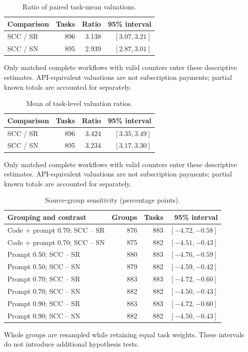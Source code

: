 \begin{table}[htbp]\centering\small
\caption{Ratio of paired task-mean valuations.}
\label{tab:scc2000-resource-pooled}
\begin{tabular}{lrrr}\toprule
Comparison & Tasks & Ratio & 95\% interval\\\midrule
SCC / SR & 896 & 3.138 & $[3.07, 3.21]$\\
SCC / SN & 895 & 2.939 & $[2.87, 3.01]$\\
\bottomrule\end{tabular}
\par\smallskip\noindent Only matched complete workflows with valid counters enter these descriptive estimates. API-equivalent valuations are not subscription payments; partial known totals are accounted for separately.
\end{table}

\begin{table}[htbp]\centering\small
\caption{Mean of task-level valuation ratios.}
\label{tab:scc2000-resource-mean_ratio}
\begin{tabular}{lrrr}\toprule
Comparison & Tasks & Ratio & 95\% interval\\\midrule
SCC / SR & 896 & 3.424 & $[3.35, 3.49]$\\
SCC / SN & 895 & 3.234 & $[3.17, 3.30]$\\
\bottomrule\end{tabular}
\par\smallskip\noindent Only matched complete workflows with valid counters enter these descriptive estimates. API-equivalent valuations are not subscription payments; partial known totals are accounted for separately.
\end{table}

\begin{table}[htbp]\centering\small
\caption{Source-group sensitivity (percentage points).}
\label{tab:scc2000-source}
\begin{tabular}{lrrr}\toprule
Grouping and contrast & Groups & Tasks & 95\% interval\\\midrule
Code + prompt 0.70; SCC -- SR & 876 & 883 & $[-4.72, -0.58]$\\
Code + prompt 0.70; SCC -- SN & 875 & 882 & $[-4.51, -0.43]$\\
Prompt 0.50; SCC -- SR & 880 & 883 & $[-4.76, -0.59]$\\
Prompt 0.50; SCC -- SN & 879 & 882 & $[-4.59, -0.42]$\\
Prompt 0.70; SCC -- SR & 883 & 883 & $[-4.72, -0.60]$\\
Prompt 0.70; SCC -- SN & 882 & 882 & $[-4.50, -0.43]$\\
Prompt 0.90; SCC -- SR & 883 & 883 & $[-4.72, -0.60]$\\
Prompt 0.90; SCC -- SN & 882 & 882 & $[-4.50, -0.43]$\\
\bottomrule\end{tabular}
\par\smallskip\noindent Whole groups are resampled while retaining equal task weights. These intervals do not introduce additional hypothesis tests.
\end{table}

